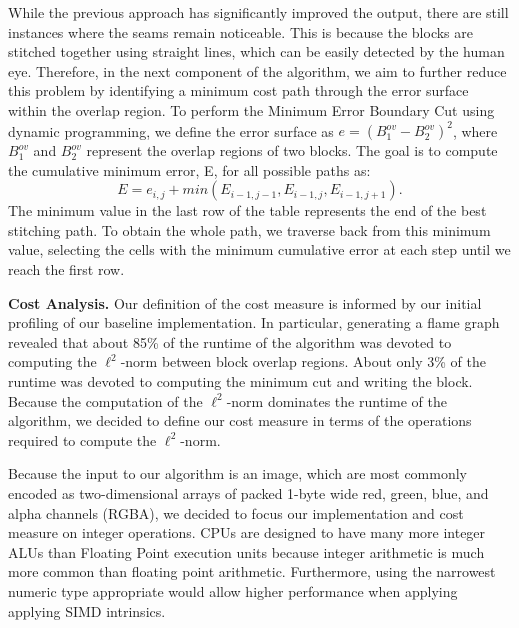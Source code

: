 \documentclass[letterpaper]{article}
\newcommand{\mypar}[1]{{\bf #1.}}
\begin{document}
While the previous approach has significantly improved the output, there are still instances where the seams remain noticeable. This is because the blocks are stitched together using straight lines, which can be easily detected by the human eye. Therefore, in the next component of the algorithm, we aim to further reduce this problem by identifying a minimum cost path through the error surface within the overlap region. To perform the Minimum Error Boundary Cut using dynamic programming, we define the error surface as ${e = (B^{ov}_{1} - B^{ov}_{2})^{2}}$, where ${B^{ov}_{1}}$ and ${B^{ov}_{2}}$ represent the overlap regions of two blocks. The goal is to compute the cumulative minimum error, E, for all possible paths as:
\[ E = e_{i,j} + min(E_{i-1,j-1}, E_{i-1,j}, E_{i-1,j+1}). \]
The minimum value in the last row of the table represents the end of the best stitching path. To obtain the whole path, we traverse back from this minimum value, selecting the cells with the minimum cumulative error at each step until we reach the first row.

\mypar{Cost Analysis} Our definition of the cost measure is informed by our initial profiling of our baseline implementation. In particular, generating a flame graph revealed that about 85\% of the runtime of the algorithm was devoted to computing the $\ell ^2$-norm between block overlap regions. About only 3\% of the runtime was devoted to computing the minimum cut and writing the block. Because the computation of the $\ell ^2$-norm dominates the runtime of the algorithm, we decided to define our cost measure in terms of the operations required to compute the $\ell ^2$-norm.

Because the input to our algorithm is an image, which are most commonly encoded as two-dimensional arrays of packed 1-byte wide red, green, blue, and alpha channels (RGBA), we decided to focus our implementation and cost measure on integer operations. CPUs are designed to have many more integer ALUs than Floating Point execution units because integer arithmetic is much more common than floating point arithmetic. Furthermore, using the narrowest numeric type appropriate would allow higher performance when applying applying SIMD intrinsics.
\end{document}
